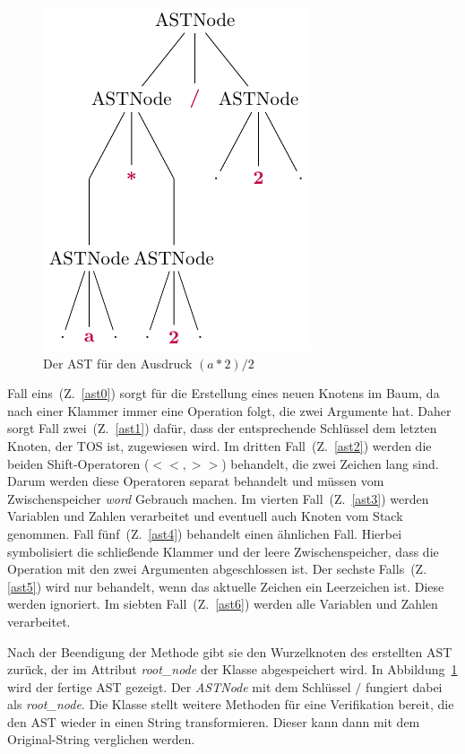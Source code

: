 \begin{figure}
    \vspace{-10mm}
    \begin{center}
      \includegraphics[scale=1.2]{../fig/ast.pdf}
    \end{center}
    \caption{Der AST für den Ausdruck $(a * 2) / 2$}
    \label{fig:astexp}
\end{figure}

Fall eins~(Z.~\ref{ast0}) sorgt für die Erstellung eines neuen Knotens im Baum, da nach einer Klammer immer eine Operation folgt, die zwei Argumente hat.
Daher sorgt Fall zwei~(Z.~\ref{ast1}) dafür, dass der entsprechende Schlüssel dem letzten Knoten, der TOS ist, zugewiesen wird. 
Im dritten Fall~(Z.~\ref{ast2}) werden die beiden Shift-Operatoren ($<<, >>$) behandelt, die zwei Zeichen lang sind. Darum werden diese Operatoren separat behandelt und müssen
vom Zwischenspeicher \textit{word} Gebrauch machen.
Im vierten Fall~(Z.~\ref{ast3}) werden Variablen und Zahlen verarbeitet und eventuell auch Knoten vom Stack genommen.
Fall fünf~(Z.~\ref{ast4}) behandelt einen ähnlichen Fall. Hierbei symbolisiert die schließende Klammer und der leere Zwischenspeicher, dass die Operation mit den zwei Argumenten abgeschlossen ist. 
Der sechste Falls~(Z. \ref{ast5}) wird nur behandelt, wenn das aktuelle Zeichen ein Leerzeichen ist. Diese werden ignoriert.
Im siebten Fall~(Z.~\ref{ast6}) werden alle Variablen und Zahlen verarbeitet.

Nach der Beendigung der Methode gibt sie den Wurzelknoten des erstellten AST zurück, der im Attribut \textit{root\_node} der Klasse abgespeichert wird.
In Abbildung~\ref{fig:astexp} wird der fertige AST gezeigt.
Der \textit{ASTNode} mit dem Schlüssel $/$ fungiert dabei als \textit{root\_node}.
Die Klasse stellt weitere Methoden für eine Verifikation bereit, die den AST wieder in einen String transformieren. Dieser kann dann mit dem Original-String verglichen werden.

